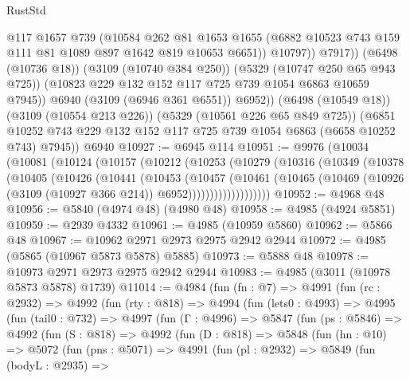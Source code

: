 \begin{lexlean}{RustStd}
\begin{coremodule}
                    @117
                    @1657
                    @739
                    (@10584
                      @262
                      @81
                      @1653
                      @1655
                      (@6882 @10523 @743 @159 @111 @81 @1089 @897 @1642 @819 @10653 @6651))
                    @10797))
                @7917))
            (@6498 (@10736 @18))
            (@3109 (@10740 @384 @250))
            (@5329 (@10747 @250 @65 @943 @725))
            (@10823 @229 @132 @152 @117 @725 @739 @1054 @6863 @10659 @7945))
          @6940
          (@3109 (@6946 @361 @6551))
          @6952))
      (@6498 (@10549 @18))
      (@3109 (@10554 @213 @226))
      (@5329 (@10561 @226 @65 @849 @725))
      (@6851 @10252 @743 @229 @132 @152 @117 @725 @739 @1054 @6863 (@6658 @10252 @743) @7945))
    @6940
@10927 := @6945 @114
@10951 := @9976
    (@10034
      (@10081
        (@10124
          (@10157
            (@10212
              (@10253
                (@10279
                  (@10316
                    (@10349
                      (@10378
                        (@10405
                          (@10426
                            (@10441
                              (@10453
                                (@10457
                                  (@10461
                                    (@10465
                                      (@10469
                                        (@10926 (@3109 (@10927 @366 @214)) @6952)))))))))))))))))))
@10952 := @4968 @48
@10956 := @5840 (@4974 @48) (@4980 @48)
@10958 := @4985 (@4924 @5851)
@10959 := @2939 @4332
@10961 := @4985 (@10959 @5860)
@10962 := @5866 @48
@10967 := @10962 @2971 @2973 @2975 @2942 @2944
@10972 := @4985 (@5865 (@10967 @5873 @5878) @5885)
@10973 := @5888 @48
@10978 := @10973 @2971 @2973 @2975 @2942 @2944
@10983 := @4985 (@3011 (@10978 @5873 @5878) @1739)
@11014 := @4984
    (fun (fn : @7) =>
    @4991
      (fun (rc : @2932) =>
      @4992
        (fun (rty : @818) =>
        @4994
          (fun (lets0 : @4993) =>
          @4995
            (fun (tail0 : @732) =>
            @4997
              (fun (Γ : @4996) =>
              @5847
                (fun (ps : @5846) =>
                @4992
                  (fun (S : @818) =>
                  @4992
                    (fun (D : @818) =>
                    @5848
                      (fun (hn : @10) =>
                      @5072
                        (fun (pns : @5071) =>
                        @4991
                          (fun (pl : @2932) =>
                          @5849
                            (fun (bodyL : @2935) =>

\end{coremodule}
\end{lexlean}
